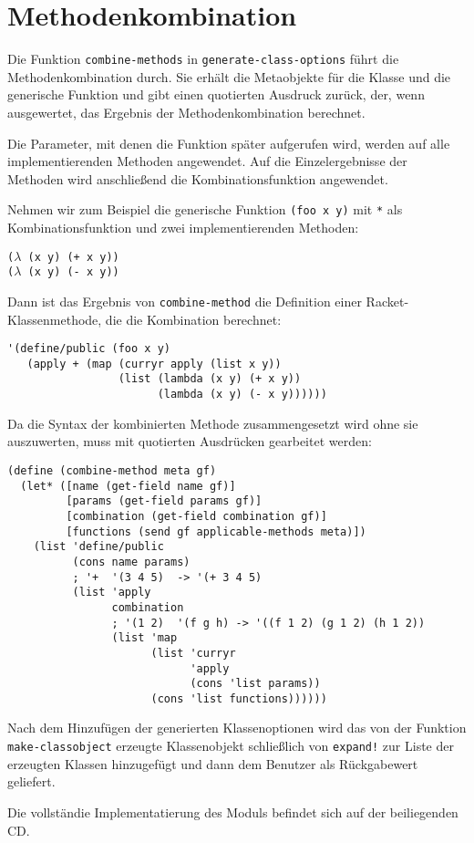 \section{Methodenkombination}
\label{combination-impl}
Die Funktion \texttt{combine-methods} in \texttt{generate-class-options} führt die Methodenkombination durch. Sie erhält die Metaobjekte für die Klasse und die generische Funktion und gibt einen quotierten Ausdruck zurück, der, wenn ausgewertet, das Ergebnis der Methodenkombination berechnet.

Die Parameter, mit denen die Funktion später aufgerufen wird, werden auf alle implementierenden Methoden angewendet. Auf die Einzelergebnisse der Methoden wird anschließend die Kombinationsfunktion angewendet.

Nehmen wir zum Beispiel die generische Funktion \texttt{(foo x y)} mit \texttt{*} als Kombinationsfunktion und zwei implementierenden Methoden:

\texttt{($\lambda$ (x y) (+ x y))\\
($\lambda$ (x y) (- x y))}

Dann ist das Ergebnis von \texttt{combine-method} die Definition einer Racket-Klassenmethode, die die Kombination berechnet:

\begin{lstlisting}
'(define/public (foo x y)
   (apply + (map (curryr apply (list x y))
                 (list (lambda (x y) (+ x y))
                       (lambda (x y) (- x y))))))
\end{lstlisting}

Da die Syntax der kombinierten Methode zusammengesetzt wird ohne sie auszuwerten, muss mit quotierten Ausdrücken gearbeitet werden:

\begin{lstlisting}
(define (combine-method meta gf)
  (let* ([name (get-field name gf)]
         [params (get-field params gf)]
         [combination (get-field combination gf)]
         [functions (send gf applicable-methods meta)])
    (list 'define/public
          (cons name params)
          ; '+  '(3 4 5)  -> '(+ 3 4 5)
          (list 'apply
                combination
                ; '(1 2)  '(f g h) -> '((f 1 2) (g 1 2) (h 1 2))
                (list 'map
                      (list 'curryr
                            'apply
                            (cons 'list params))
                      (cons 'list functions))))))
\end{lstlisting}

Nach dem Hinzufügen der generierten Klassenoptionen wird das von der Funktion \texttt{make-classobject} erzeugte Klassenobjekt schließlich von \texttt{expand!} zur Liste der erzeugten Klassen hinzugefügt und dann dem Benutzer als Rückgabewert geliefert. 

Die vollständie Implementatierung des Moduls befindet sich auf der beiliegenden CD.